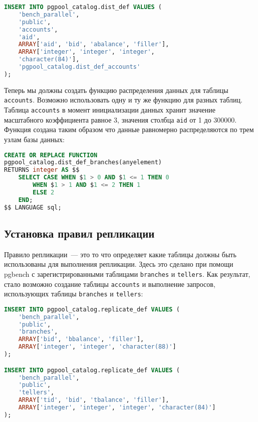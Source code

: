 \begin{lstlisting}[language=SQL,label=lst:pgpool33,caption=Установка правил распределения данных]
INSERT INTO pgpool_catalog.dist_def VALUES (
    'bench_parallel',
    'public',
    'accounts',
    'aid',
    ARRAY['aid', 'bid', 'abalance', 'filler'],
    ARRAY['integer', 'integer', 'integer',
    'character(84)'],
    'pgpool_catalog.dist_def_accounts'
);
\end{lstlisting}

Теперь мы должны создать функцию распределения данных для таблицы \lstinline!accounts!. Возможно использовать одну и ту же функцию для разных таблиц. Таблица \lstinline!accounts! в момент инициализации данных хранит значение масштабного коэффициента равное 3, значения столбца \lstinline!aid! от 1 до 300000. Функция создана таким образом что данные равномерно распределяются по трем узлам базы данных:

\begin{lstlisting}[language=SQL,label=lst:pgpool34,caption=Установка правил распределения данных]
CREATE OR REPLACE FUNCTION
pgpool_catalog.dist_def_branches(anyelement)
RETURNS integer AS $$
    SELECT CASE WHEN $1 > 0 AND $1 <= 1 THEN 0
        WHEN $1 > 1 AND $1 <= 2 THEN 1
        ELSE 2
    END;
$$ LANGUAGE sql;
\end{lstlisting}

\subsection{Установка правил репликации}

Правило репликации~--- это то что определяет какие таблицы должны быть использованы для выполнения репликации. Здесь это сделано при помощи pgbench с зарегистрированными таблицами \lstinline!branches! и \lstinline!tellers!. Как результат, стало возможно создание таблицы \lstinline!accounts! и выполнение запросов, использующих таблицы \lstinline!branches! и \lstinline!tellers!:

\begin{lstlisting}[language=SQL,label=lst:pgpool35,caption=Установка правил репликации]
INSERT INTO pgpool_catalog.replicate_def VALUES (
    'bench_parallel',
    'public',
    'branches',
    ARRAY['bid', 'bbalance', 'filler'],
    ARRAY['integer', 'integer', 'character(88)']
);

INSERT INTO pgpool_catalog.replicate_def VALUES (
    'bench_parallel',
    'public',
    'tellers',
    ARRAY['tid', 'bid', 'tbalance', 'filler'],
    ARRAY['integer', 'integer', 'integer', 'character(84)']
);
\end{lstlisting}

